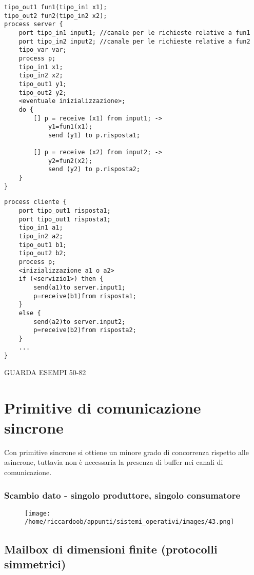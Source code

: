 \begin{verbatim}
tipo_out1 fun1(tipo_in1 x1);
tipo_out2 fun2(tipo_in2 x2);
process server {
    port tipo_in1 input1; //canale per le richieste relative a fun1
    port tipo_in2 input2; //canale per le richieste relative a fun2
    tipo_var var;
    process p;
    tipo_in1 x1;
    tipo_in2 x2;
    tipo_out1 y1;
    tipo_out2 y2;
    <eventuale inizializzazione>;
    do {
        [] p = receive (x1) from input1; ->
            y1=fun1(x1);
            send (y1) to p.risposta1;

        [] p = receive (x2) from input2; ->
            y2=fun2(x2);
            send (y2) to p.risposta2;
    }
}
\end{verbatim}

\begin{verbatim}
process cliente {
    port tipo_out1 risposta1;
    port tipo_out1 risposta1;
    tipo_in1 a1;
    tipo_in2 a2;
    tipo_out1 b1;
    tipo_out2 b2;
    process p;
    <inizializzazione a1 o a2>
    if (<servizio1>) then {
        send(a1)to server.input1;
        p=receive(b1)from risposta1;
    }
    else {
        send(a2)to server.input2;
        p=receive(b2)from risposta2;
    }
    ...
}
\end{verbatim}


GUARDA ESEMPI 50-82

\section{Primitive di comunicazione sincrone}
Con primitive sincrone si ottiene un minore grado di concorrenza rispetto alle asincrone, tuttavia non è necessaria la presenza di buffer nei canali di comunicazione.

\subsubsection{Scambio dato - singolo produttore, singolo consumatore}
\begin{figure}[H]
    \centering
    \texttt{[image: /home/riccardoob/appunti/sistemi\_operativi/images/43.png]}
\end{figure}

\subsection{Mailbox di dimensioni finite (protocolli simmetrici)}

